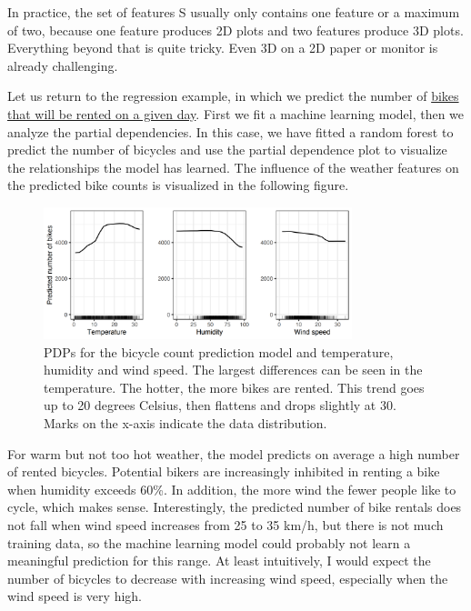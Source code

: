 \documentclass[
  11pt,
]{scrbook}
\begin{document}
In practice, the set of features S usually only contains one feature or a maximum of two, because one feature produces 2D plots and two features produce 3D plots.
Everything beyond that is quite tricky.
Even 3D on a 2D paper or monitor is already challenging.

Let us return to the regression example, in which we predict the number of \protect\hyperlink{bike-data}{bikes that will be rented on a given day}.
First we fit a machine learning model, then we analyze the partial dependencies.
In this case, we have fitted a random forest to predict the number of bicycles and use the partial dependence plot to visualize the relationships the model has learned.
The influence of the weather features on the predicted bike counts is visualized in the following figure.

\begin{figure}

{\centering \includegraphics[width=0.8\textwidth]{images/pdp-bike-1} 

}

\caption{PDPs for the bicycle count prediction model and temperature, humidity and wind speed. The largest differences can be seen in the temperature. The hotter, the more bikes are rented. This trend goes up to 20 degrees Celsius, then flattens and drops slightly at 30. Marks on the x-axis indicate the data distribution.}\label{fig:pdp-bike}
\end{figure}

For warm but not too hot weather, the model predicts on average a high number of rented bicycles.
Potential bikers are increasingly inhibited in renting a bike when humidity exceeds 60\%.
In addition, the more wind the fewer people like to cycle, which makes sense.
Interestingly, the predicted number of bike rentals does not fall when wind speed increases from 25 to 35 km/h, but there is not much training data, so the machine learning model could probably not learn a meaningful prediction for this range.
At least intuitively, I would expect the number of bicycles to decrease with increasing wind speed, especially when the wind speed is very high.
\end{document}
